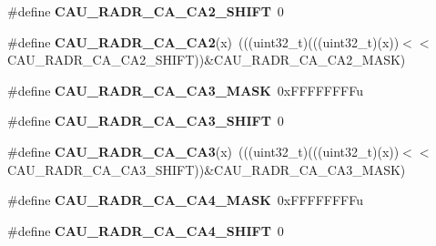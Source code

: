 \begin{DoxyCompactItemize}
\item 
\#define {\bfseries C\+A\+U\+\_\+\+R\+A\+D\+R\+\_\+\+C\+A\+\_\+\+C\+A2\+\_\+\+S\+H\+I\+FT}~0\hypertarget{group__CAU__Register__Masks_gac9854347914cb338851c9a252aca148e}{}\label{group__CAU__Register__Masks_gac9854347914cb338851c9a252aca148e}

\item 
\#define {\bfseries C\+A\+U\+\_\+\+R\+A\+D\+R\+\_\+\+C\+A\+\_\+\+C\+A2}(x)~(((uint32\+\_\+t)(((uint32\+\_\+t)(x))$<$$<$C\+A\+U\+\_\+\+R\+A\+D\+R\+\_\+\+C\+A\+\_\+\+C\+A2\+\_\+\+S\+H\+I\+FT))\&C\+A\+U\+\_\+\+R\+A\+D\+R\+\_\+\+C\+A\+\_\+\+C\+A2\+\_\+\+M\+A\+SK)\hypertarget{group__CAU__Register__Masks_ga3d1fbf4e309510b81c96da1080f52d32}{}\label{group__CAU__Register__Masks_ga3d1fbf4e309510b81c96da1080f52d32}

\item 
\#define {\bfseries C\+A\+U\+\_\+\+R\+A\+D\+R\+\_\+\+C\+A\+\_\+\+C\+A3\+\_\+\+M\+A\+SK}~0x\+F\+F\+F\+F\+F\+F\+F\+Fu\hypertarget{group__CAU__Register__Masks_ga954f8fa4bd147e796210d7d13b423765}{}\label{group__CAU__Register__Masks_ga954f8fa4bd147e796210d7d13b423765}

\item 
\#define {\bfseries C\+A\+U\+\_\+\+R\+A\+D\+R\+\_\+\+C\+A\+\_\+\+C\+A3\+\_\+\+S\+H\+I\+FT}~0\hypertarget{group__CAU__Register__Masks_ga63b462a741709ed694a6bb20912783e4}{}\label{group__CAU__Register__Masks_ga63b462a741709ed694a6bb20912783e4}

\item 
\#define {\bfseries C\+A\+U\+\_\+\+R\+A\+D\+R\+\_\+\+C\+A\+\_\+\+C\+A3}(x)~(((uint32\+\_\+t)(((uint32\+\_\+t)(x))$<$$<$C\+A\+U\+\_\+\+R\+A\+D\+R\+\_\+\+C\+A\+\_\+\+C\+A3\+\_\+\+S\+H\+I\+FT))\&C\+A\+U\+\_\+\+R\+A\+D\+R\+\_\+\+C\+A\+\_\+\+C\+A3\+\_\+\+M\+A\+SK)\hypertarget{group__CAU__Register__Masks_gaa8819ee05a7fdbb53bee279104bf7d33}{}\label{group__CAU__Register__Masks_gaa8819ee05a7fdbb53bee279104bf7d33}

\item 
\#define {\bfseries C\+A\+U\+\_\+\+R\+A\+D\+R\+\_\+\+C\+A\+\_\+\+C\+A4\+\_\+\+M\+A\+SK}~0x\+F\+F\+F\+F\+F\+F\+F\+Fu\hypertarget{group__CAU__Register__Masks_ga9d0f7744ac9647b00fd84c95c76e763b}{}\label{group__CAU__Register__Masks_ga9d0f7744ac9647b00fd84c95c76e763b}

\item 
\#define {\bfseries C\+A\+U\+\_\+\+R\+A\+D\+R\+\_\+\+C\+A\+\_\+\+C\+A4\+\_\+\+S\+H\+I\+FT}~0\hypertarget{group__CAU__Register__Masks_gaeb4fe1e9be3bcb2b1ac74660b92e9a4b}{}\label{group__CAU__Register__Masks_gaeb4fe1e9be3bcb2b1ac74660b92e9a4b}


\end{DoxyCompactItemize}
